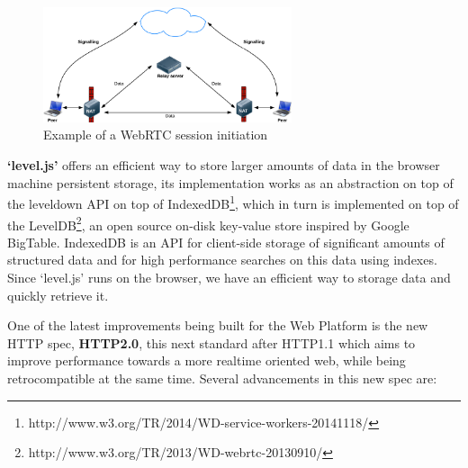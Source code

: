\begin{figure}[h!]
  \centering
  \includegraphics[width=0.65\textwidth]{img/webrtc.png}
  \caption{Example of a WebRTC session initiation}
  \label{fig:webrtc}
\end{figure}

% 
% 

\textbf{`level.js'} offers an efficient way to store larger amounts of data in the browser machine persistent storage, its implementation works as an abstraction on top of the leveldown API on top of IndexedDB\footnote{http://www.w3.org/TR/2014/WD-service-workers-20141118/}, which in turn is implemented on top of the LevelDB\footnote{http://www.w3.org/TR/2013/WD-webrtc-20130910/}, an open source on-disk key-value store inspired by Google BigTable. IndexedDB is an API for client-side storage of significant amounts of structured data and for high performance searches on this data using indexes. Since `level.js' runs on the browser, we have an efficient way to storage data and quickly retrieve it.

One of the latest improvements being built for the Web Platform is the new HTTP spec, \textbf{HTTP2.0}\cite{Thomson2013}, this next standard after HTTP1.1 which aims to improve performance towards a more realtime oriented web, while being retrocompatible at the same time. Several advancements in this new spec are:

